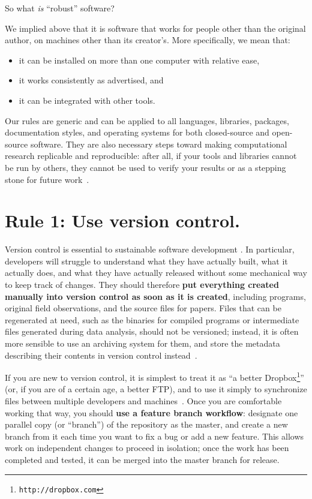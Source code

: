 \documentclass[10pt,letterpaper]{article}
\newcommand{\withurl}[2]{{#1}\footnote{\texttt{#2}}}
\newcommand{\rulemajor}[1]{\section{#1}}
\newcommand{\ruleminor}[1]{\textbf{#1}}
\newcommand{\reviewed}[1]{{\color{black}#1}}
\begin{document}
So what \emph{is} ``robust'' software?
\reviewed{We implied above that it is software that works for people other than the original author,
on machines other than its creator's.
More specifically, we mean that:

\begin{itemize}
\item
  it can be installed on more than one computer with relative ease,
\item
  it works consistently as advertised, and
\item
  it can be integrated with other tools.
\end{itemize}

Our rules are generic and can be applied to all languages, libraries, packages,
documentation styles, and operating systems for both closed-source and open-source software. 
They are also necessary steps toward making computational research replicable and reproducible:
after all,
if your tools and libraries cannot be run by others,
they cannot be used to verify your results or as a stepping stone for future work~\cite{brown2013}.}

\reviewed{\rulemajor{Rule 1: Use version control.}

Version control is essential to sustainable software development
\cite{wilson2014,wilson2016}.
In particular,
developers will struggle to understand what they have actually built,
what it actually does,
and what they have actually released
without some mechanical way to keep track of changes.
They should therefore
\ruleminor{put everything created manually into version control as soon as it is created},
including programs, original field observations, and the source files for papers.
Files that can be regenerated at need,
such as the binaries for compiled programs or intermediate files generated during data analysis,
should not be versioned;
instead,
it is often more sensible to use an archiving system for them,
and store the metadata describing their contents in version control instead~\cite{noble2009}.

If you are new to version control,
it is simplest to treat it as ``a better \withurl{Dropbox}{http://dropbox.com}''
(or, if you are of a certain age, a better FTP),
and to use it simply to synchronize files between multiple developers and machines~\cite{blischak2016}.
Once you are comfortable working that way,
you should \ruleminor{use a feature branch workflow}:
designate one parallel copy (or ``branch'') of the repository as the master,
and create a new branch from it each time you want to fix a bug or add a new feature.
This allows work on independent changes to proceed in isolation;
once the work has been completed and tested,
it can be merged into the master branch for release.}
\end{document}

